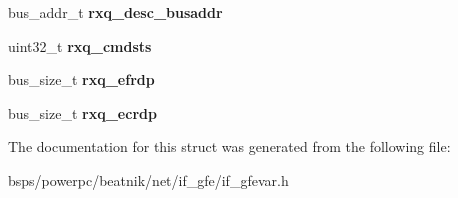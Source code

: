 \begin{DoxyCompactItemize}
\mbox{\label{structgfe__rxqueue_a0d4f7f50ae933f0a671936dc6193b48d}} 
bus\+\_\+addr\+\_\+t {\bfseries rxq\+\_\+desc\+\_\+busaddr}
\item 
\mbox{\label{structgfe__rxqueue_af8ff67fb0e1d80d13a67ce6cdfd6a852}} 
uint32\+\_\+t {\bfseries rxq\+\_\+cmdsts}
\item 
\mbox{\label{structgfe__rxqueue_aa97005713846267bfe2c6c3c7a7892af}} 
bus\+\_\+size\+\_\+t {\bfseries rxq\+\_\+efrdp}
\item 
\mbox{\label{structgfe__rxqueue_ad3a0a195525ad2f6109b53bc5ffa8fa4}} 
bus\+\_\+size\+\_\+t {\bfseries rxq\+\_\+ecrdp}
\end{DoxyCompactItemize}


The documentation for this struct was generated from the following file\+:\begin{DoxyCompactItemize}
\item 
bsps/powerpc/beatnik/net/if\+\_\+gfe/if\+\_\+gfevar.\+h\end{DoxyCompactItemize}
